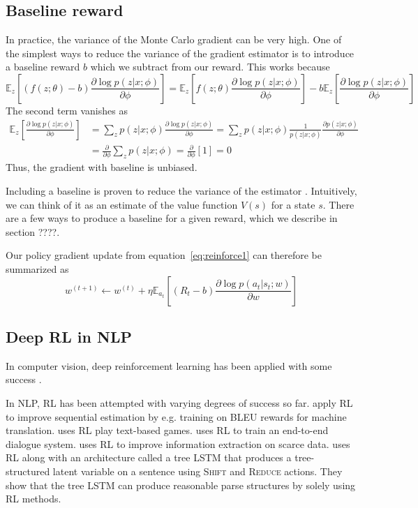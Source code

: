 \documentclass[11pt]{report}
\begin{document}
\subsection{Baseline reward}
In practice, the variance of the Monte Carlo gradient can be very high. One of the simplest ways to reduce the variance of the gradient estimator is to introduce a baseline reward $b$ which we subtract from our reward. This works because
\begin{equation}
\mathbb{E}_z \left[ (f(z; \theta) - b) \frac{\partial \log p(z | x; \phi)}{\partial \phi} \right] = \mathbb{E}_z \left[ f(z ; \theta) \frac{\partial \log p(z | x; \phi)}{\partial \phi} \right] - b \mathbb{E}_z \left[ \frac{\partial \log p(z | x; \phi)}{\partial \phi} \right]
\end{equation}
The second term vanishes as
\begin{align*}
\mathbb{E}_z \left[ \frac{\partial \log p(z | x; \phi)}{\partial \phi} \right] &= \sum_z p(z | x; \phi) \frac{\partial \log p(z | x; \phi)}{\partial \phi} =  \sum_z p(z | x; \phi) \frac{1}{p(z | x; \phi)} \frac{\partial  p(z | x; \phi)}{\partial \phi}  \\
&= \frac{\partial}{\partial \phi} \sum_z p(z | x; \phi) =  \frac{\partial}{\partial \phi} [1] = 0
\end{align*}
Thus, the gradient with baseline is unbiased.

Including a baseline is proven to reduce the variance of the estimator \citep{Weaver2001}. Intuitively, we can think of it as an estimate of the value function $V(s)$ for a state $s$. There are a few ways to produce a baseline for a given reward, which we describe in section ????.

Our policy gradient update from equation~\ref{eq:reinforce1} can therefore be summarized as
\begin{equation}
w^{(t+1)} \gets w^{(t)} + \eta \mathbb{E}_{a_t} \left[ (R_t - b) \frac{\partial \log p(a_t | s_t; w)}{\partial w} \right]
\end{equation}


\subsection{Deep RL in NLP}

In computer vision, deep reinforcement learning has been applied with some success 
\citep{mnih2014visualattention, ba2015visualattention, xu2015captioning}.

In NLP, RL has been attempted with varying degrees of success so far.
\citet{ranzato2015} apply RL to improve sequential estimation by e.g. training on BLEU rewards for machine translation.
\citet{Narasimhan2015} uses RL play text-based games.
\citet{li2016dialogueRL} uses RL to train an end-to-end dialogue system.
\citet{narasimhan2016} uses RL to improve information extraction on scarce data.
\citet{Yogatama2017} uses RL along with an architecture called a tree LSTM that produces a tree-structured latent variable on a sentence using \textsc{Shift} and \textsc{Reduce} actions. They show that the tree LSTM can produce reasonable parse structures by solely using RL methods.
\end{document}
